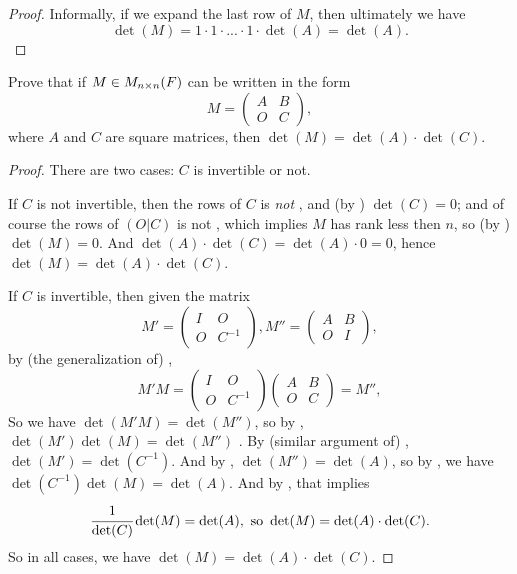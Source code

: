 \begin{proof}
Informally, if we expand the last row of \(M\), then ultimately we have
\[
    \det(M) = 1 \cdot 1 \cdot ... \cdot 1 \cdot \det(A) = \det(A).
\]
\end{proof}

\begin{exercise} \label{exercise 4.3.21}
Prove that if \(M \in M_{n \times n}(F)\) can be written in the form
\[
    M = \begin{pmatrix} A & B \\ O & C \end{pmatrix},
\]
where \(A\) and \(C\) are square matrices, then \(\det(M) = \det(A) \cdot \det(C)\).
\end{exercise}


\begin{proof}
There are two cases: \(C\) is invertible or not.

If \(C\) is not invertible, then the rows of \(C\) is \emph{not} \LID{}, and (by ) \(\det(C) = 0\);
and of course the rows of \((O|C)\) is not \LID{}, which implies \(M\) has rank less then \(n\), so (by ) \(\det(M) = 0\).
And \(\det(A) \cdot \det(C) = \det(A) \cdot 0 = 0\), hence \(\det(M) = \det(A) \cdot \det(C)\).

If \(C\) is invertible, then given the matrix
\[
    M' = \begin{pmatrix} I & O \\ O & C^{-1} \end{pmatrix},
    M'' = \begin{pmatrix} A & B \\ O & I \end{pmatrix},
\]
by (the generalization of) ,
\[
    M' M =
    \begin{pmatrix} I & O \\ O & C^{-1} \end{pmatrix}
    \begin{pmatrix} A & B \\ O & C \end{pmatrix}
    = M'',
\]
So we have \(\det(M' M) = \det(M'')\), so by , \(\det(M')\det(M) = \det(M'')\) .
By (similar argument of) , \(\det(M') = \det(C^{-1})\).
And by , \(\det(M'') = \det(A)\), so by , we have \(\det(C^{-1}) \det(M) = \det(A)\).
And by , that implies
\[
    \cfrac{1}{\det(C)} \det(M) = \det(A), \text{ so } \det(M) = \det(A) \cdot \det(C).
\]
So in all cases, we have \(\det(M) = \det(A) \cdot \det(C)\).
\end{proof}

